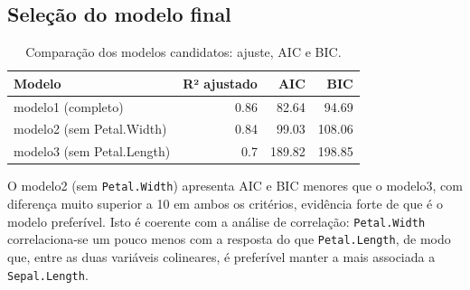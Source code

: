 \documentclass[a4paper]{_extensions/modeloufcg/modeloUFCG}
\begin{document}
\subsection{Seleção do modelo
final}\label{seleuxe7uxe3o-do-modelo-final}

{

\begin{longtable}[]{@{}lrrr@{}}

\caption{\label{tbl-selecao}Comparação dos modelos candidatos: ajuste,
AIC e BIC.}

\tabularnewline

\toprule\noalign{}
Modelo & R² ajustado & AIC & BIC \\
\midrule\noalign{}
\endhead
\bottomrule\noalign{}
\endlastfoot
modelo1 (completo) & 0.86 & 82.64 & 94.69 \\
modelo2 (sem Petal.Width) & 0.84 & 99.03 & 108.06 \\
modelo3 (sem Petal.Length) & 0.7 & 189.82 & 198.85 \\

\end{longtable}

}

O modelo2 (sem \texttt{Petal.Width}) apresenta AIC e BIC menores que o
modelo3, com diferença muito superior a 10 em ambos os critérios,
evidência forte de que é o modelo preferível. Isto é coerente com a
análise de correlação: \texttt{Petal.Width} correlaciona-se um pouco
menos com a resposta do que \texttt{Petal.Length}, de modo que, entre as
duas variáveis colineares, é preferível manter a mais associada a
\texttt{Sepal.Length}.
\end{document}
